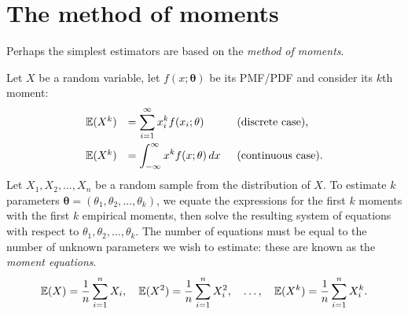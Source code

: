 
\section{The method of moments}
Perhaps the simplest estimators are based on the \emph{method of moments}.

\bigskip
Let $X$ be a random variable, let $f(x;\mathbf{\theta})$ be its PMF/PDF and consider its $k$th moment:
\[\begin{array}{lll}
\mathbb{E}(X^k) & = \displaystyle\sum_{i=1}^{\infty} x_i^k f(x_i;\mathbf{\theta}) \qquad	& \text{(discrete case),} \\[3ex]
\mathbb{E}(X^k) & = \displaystyle\int_{-\infty}^{\infty} x^k f(x;\mathbf{\theta})\,dx		& \text{(continuous case)}.
\end{array}\]
Let $X_1,X_2,\ldots,X_n$ be a random sample from the distribution of $X$. To estimate $k$ parameters $\mathbf{\theta} = (\theta_1,\theta_2,\ldots,\theta_k)$, we equate the expressions for the first $k$ moments with the first $k$ empirical moments, then solve the resulting system of equations with respect to $\theta_1,\theta_2,\ldots,\theta_k$. The number of equations must be equal to the number of unknown parameters we wish to estimate: these are known as the \emph{moment equations}.
\[
\mathbb{E}(X) = \frac{1}{n}\sum_{i=1}^n X_i,
\quad
\mathbb{E}(X^2) = \frac{1}{n}\sum_{i=1}^n X_i^2,
\quad\ldots,\quad
\mathbb{E}(X^k) = \frac{1}{n}\sum_{i=1}^n X_i^k.
\]
%

